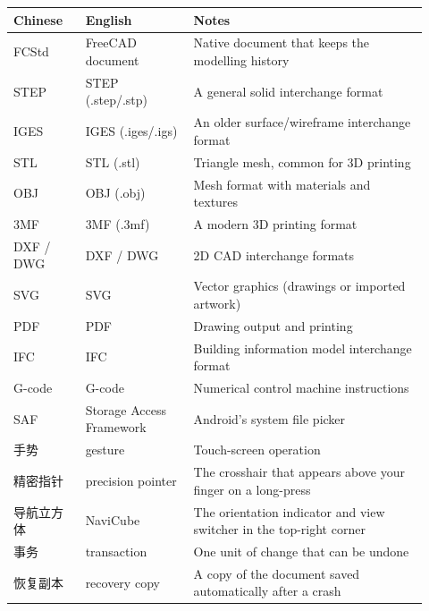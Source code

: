 \begin{longtable}{@{}p{0.16\linewidth}p{0.24\linewidth}p{0.52\linewidth}@{}}
\toprule \textbf{Chinese} & \textbf{English} & \textbf{Notes} \\ \midrule \endhead
FCStd & FreeCAD document & Native document that keeps the modelling history \\
STEP & STEP (.step/.stp) & A general solid interchange format \\
IGES & IGES (.iges/.igs) & An older surface/wireframe interchange format \\
STL & STL (.stl) & Triangle mesh, common for 3D printing \\
OBJ & OBJ (.obj) & Mesh format with materials and textures \\
3MF & 3MF (.3mf) & A modern 3D printing format \\
DXF / DWG & DXF / DWG & 2D CAD interchange formats \\
SVG & SVG & Vector graphics (drawings or imported artwork)\\
PDF & PDF & Drawing output and printing \\
IFC & IFC & Building information model interchange format \\
G-code & G-code & Numerical control machine instructions \\
SAF & Storage Access Framework & Android's system file picker \\
手势 & gesture & Touch-screen operation \\
精密指针 & precision pointer & The crosshair that appears above your finger on a long-press \\
导航立方体 & NaviCube & The orientation indicator and view switcher in the top-right corner \\
事务 & transaction & One unit of change that can be undone \\
恢复副本 & recovery copy & A copy of the document saved automatically after a crash \\
\bottomrule
\end{longtable}
